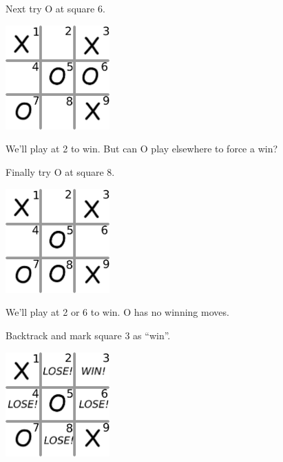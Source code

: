 \documentclass{beamer} %
\begin{document}
\begin{frame}
    Next try O at square 6.
  
  \begin{center}
\hspace{0.25in}\includegraphics[width=0.3\textwidth]{assets/oxo-board10.pdf}
\end{center}

    We'll play at 2 to win.  But can O play elsewhere to force a win?
\end{frame}

\begin{frame}
    Finally try O at square 8.
  \begin{center}
\hspace{0.25in}\includegraphics[width=0.3\textwidth]{assets/oxo-board11.pdf}
\end{center}
    We'll play at 2 or 6 to win.  O has no winning moves.
\end{frame}

\begin{frame}
    Backtrack and mark square 3 as ``win''.

    \begin{center}
\hspace{0.25in}\includegraphics[width=0.3\textwidth]{assets/oxo-board12.pdf}
\end{center}
\end{frame}
\end{document}
